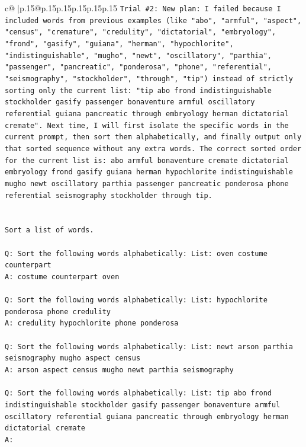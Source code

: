 \documentclass{article}
\begin{document}
{\begin{supertabular}{c@{$\;$}|p{.15\linewidth}@{}p{.15\linewidth}p{.15\linewidth}p{.15\linewidth}p{.15\linewidth}p{.15\linewidth}}
{{{\texttt{Trial \#2: New plan: I failed because I included words from previous examples (like "abo", "armful", "aspect", "census", "cremature", "credulity", "dictatorial", "embryology", "frond", "gasify", "guiana", "herman", "hypochlorite", "indistinguishable", "mugho", "newt", "oscillatory", "parthia", "passenger", "pancreatic", "ponderosa", "phone", "referential", "seismography", "stockholder", "through", "tip") instead of strictly sorting only the current list: "tip abo frond indistinguishable stockholder gasify passenger bonaventure armful oscillatory referential guiana pancreatic through embryology herman dictatorial cremate". Next time, I will first isolate the specific words in the current prompt, then sort them alphabetically, and finally output only that sorted sequence without any extra words. The correct sorted order for the current list is: abo armful bonaventure cremate dictatorial embryology frond gasify guiana herman hypochlorite indistinguishable mugho newt oscillatory parthia passenger pancreatic ponderosa phone referential seismography stockholder through tip.} \\
\\ 
\\ 
\texttt{Sort a list of words.} \\
\\ 
\texttt{Q: Sort the following words alphabetically: List: oven costume counterpart} \\
\texttt{A: costume counterpart oven} \\
\\ 
\texttt{Q: Sort the following words alphabetically: List: hypochlorite ponderosa phone credulity} \\
\texttt{A: credulity hypochlorite phone ponderosa} \\
\\ 
\texttt{Q: Sort the following words alphabetically: List: newt arson parthia seismography mugho aspect census} \\
\texttt{A: arson aspect census mugho newt parthia seismography} \\
\\ 
\texttt{Q: Sort the following words alphabetically: List: tip abo frond indistinguishable stockholder gasify passenger bonaventure armful oscillatory referential guiana pancreatic through embryology herman dictatorial cremate} \\
\texttt{A:} \\
            }
        }
    }
     \\ \\


\end{supertabular}}
\end{document}
